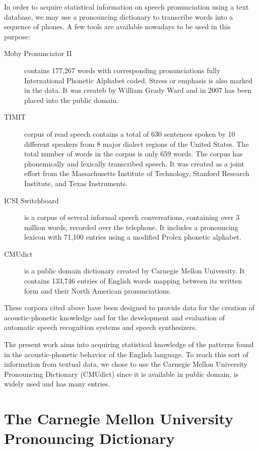 In order to acquire statistical information on speech pronunciation using
a text database, we may use a pronouncing dictionary to transcribe words
into a sequence of phones. A few tools are available nowadays to be used
in this purpose:
\begin{description}
\item[Moby Pronunciator II] contains 177,267 words with corresponding pronunciations
fully International Phonetic Alphabet coded. Stress or emphasis is also marked in the data.
It was createb by William Grady Ward and in 2007 has been placed into the public domain.
\item[TIMIT] corpus of read speech contains a total of 630 sentences spoken by
10 different speakers from 8 major dialect regions of the United States. The total
number of words in the corpus is only 659 words. The corpus has phonemically and lexically 
transcribed speech. It was created as a joint effort from  the Massachusetts
Institute of Technology, Stanford Research Institute, and Texas Instruments.
\item[ICSI Switchboard] is a corpus of several informal speech conversations, containing over
3 million words, recorded over the telephone. It includes a pronouncing lexicon with 71,100
entries using a modified Prolex phonetic alphabet.
\item[CMUdict] is a public domain dictionary created by Carnegie Mellon University. 
It contains 133,746 entries of English words mapping between its written form and their 
North American pronunciations.
\end{description}
These corpora cited above have been designed to provide data for
the creation of acoustic-phonetic knowledge and for the development and
evaluation of automatic speech recognition systems and speech synthesizers.

The present work aims into acquiring statistical knowledge of the patterns found in
the acoustic-phonetic behavior of the English language. To reach this sort of information
from textual data, we chose to use the Carnegie Mellon University Pronouncing Dictionary
(CMUdict) since it is available in public domain, is widely used and has many entries.

\section[CMUdict]{The Carnegie Mellon University Pronouncing Dictionary}

